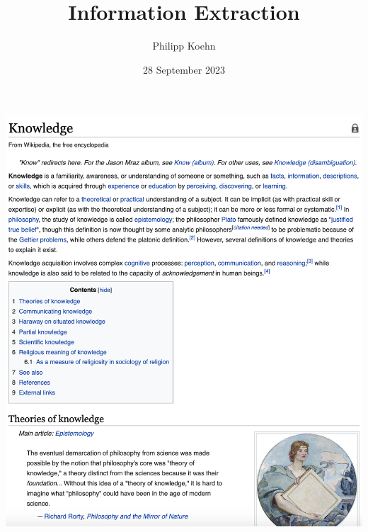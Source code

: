 \documentclass[landscape]{jhuslides3C}
\begin{document}
\rm
\title[Introduction to Human Language Technology: Information Extraction]{Information Extraction}
\author[Philipp Koehn]{Philipp Koehn}
\date{28 September 2023}
\maketitle


\vfill
\includegraphics[scale=0.35]{wikipedia-knowledge.png}
\end{document}
